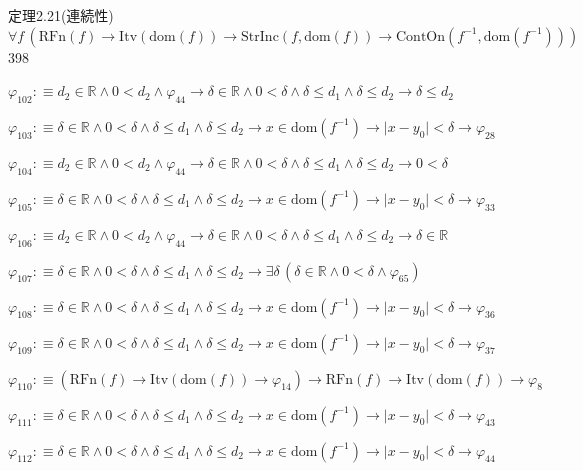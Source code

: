 \begin{fullproof}{定理2.21(連続性)}{$\forall f\,(\mathrm{RFn}(f) \to \mathrm{Itv}(\mathrm{dom}(f)) \to \mathrm{StrInc}(f,\mathrm{dom}(f)) \to \mathrm{ContOn}(f^{-1},\mathrm{dom}(f^{-1})))$}{398}
\begin{abbrevlist}
\item $\varphi_{102} :\equiv d_{2} \in \mathbb{R} \land 0 < d_{2} \land \varphi_{44} \to \delta \in \mathbb{R} \land 0 < \delta \land \delta \leq d_{1} \land \delta \leq d_{2} \to \delta \leq d_{2}$
\item $\varphi_{103} :\equiv \delta \in \mathbb{R} \land 0 < \delta \land \delta \leq d_{1} \land \delta \leq d_{2} \to x \in \mathrm{dom}(f^{-1}) \to \lvert x - y_{0} \rvert < \delta \to \varphi_{28}$
\item $\varphi_{104} :\equiv d_{2} \in \mathbb{R} \land 0 < d_{2} \land \varphi_{44} \to \delta \in \mathbb{R} \land 0 < \delta \land \delta \leq d_{1} \land \delta \leq d_{2} \to 0 < \delta$
\item $\varphi_{105} :\equiv \delta \in \mathbb{R} \land 0 < \delta \land \delta \leq d_{1} \land \delta \leq d_{2} \to x \in \mathrm{dom}(f^{-1}) \to \lvert x - y_{0} \rvert < \delta \to \varphi_{33}$
\item $\varphi_{106} :\equiv d_{2} \in \mathbb{R} \land 0 < d_{2} \land \varphi_{44} \to \delta \in \mathbb{R} \land 0 < \delta \land \delta \leq d_{1} \land \delta \leq d_{2} \to \delta \in \mathbb{R}$
\item $\varphi_{107} :\equiv \delta \in \mathbb{R} \land 0 < \delta \land \delta \leq d_{1} \land \delta \leq d_{2} \to \exists \delta\,(\delta \in \mathbb{R} \land 0 < \delta \land \varphi_{65})$
\item $\varphi_{108} :\equiv \delta \in \mathbb{R} \land 0 < \delta \land \delta \leq d_{1} \land \delta \leq d_{2} \to x \in \mathrm{dom}(f^{-1}) \to \lvert x - y_{0} \rvert < \delta \to \varphi_{36}$
\item $\varphi_{109} :\equiv \delta \in \mathbb{R} \land 0 < \delta \land \delta \leq d_{1} \land \delta \leq d_{2} \to x \in \mathrm{dom}(f^{-1}) \to \lvert x - y_{0} \rvert < \delta \to \varphi_{37}$
\item $\varphi_{110} :\equiv (\mathrm{RFn}(f) \to \mathrm{Itv}(\mathrm{dom}(f)) \to \varphi_{14}) \to \mathrm{RFn}(f) \to \mathrm{Itv}(\mathrm{dom}(f)) \to \varphi_{8}$
\item $\varphi_{111} :\equiv \delta \in \mathbb{R} \land 0 < \delta \land \delta \leq d_{1} \land \delta \leq d_{2} \to x \in \mathrm{dom}(f^{-1}) \to \lvert x - y_{0} \rvert < \delta \to \varphi_{43}$
\item $\varphi_{112} :\equiv \delta \in \mathbb{R} \land 0 < \delta \land \delta \leq d_{1} \land \delta \leq d_{2} \to x \in \mathrm{dom}(f^{-1}) \to \lvert x - y_{0} \rvert < \delta \to \varphi_{44}$

\end{abbrevlist}
\end{fullproof}
